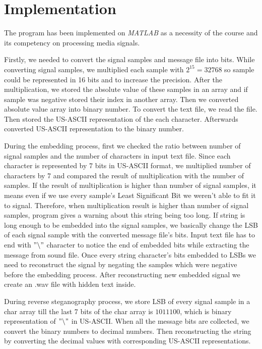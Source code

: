 \documentclass[twocolumns]{IEEEtran}
\begin{document}
	\section{Implementation}
	The program has been implemented on \textit{MATLAB} as a necessity of the course and its competency on processing media signals.
	
	Firstly, we needed to convert the signal samples and message file into bits. While converting  signal samples, we multiplied each sample with $2^{15} = 32768$ so sample could be represented in 16 bits and to increase the precision. After the multiplication, we stored the absolute value of these samples in an array and if sample was negative stored their index in another array. Then we converted absolute value array into binary number. To convert the text file, we read the file. Then stored the US-ASCII representation of the each character. Afterwards converted US-ASCII representation to the binary number.
	
	During the embedding process, first we checked the ratio between number of signal samples and the number of characters in input text file. Since each character is represented by 7 bits in US-ASCII format, we multiplied number of characters by 7 and compared the result of multiplication with the number of samples. If the result of multiplication  is higher than number of signal samples, it means even if we use every sample's Least Significant Bit we weren't able to fit it to signal. Therefore, when multiplication result is higher than number of signal samples, program gives a warning about this string being too long. If string is long enough to be embedded into the signal samples, we basically change the LSB of each signal sample with the converted message file's bits. Input text file has to end with $"\backslash "$ character to notice the end of embedded bits while extracting the message from sound file. Once every string character's bits embedded to LSBs we need to reconstruct the signal by negating the samples which were negative before the embedding process. After reconstructing new embedded signal we create an .wav file with hidden text inside.
	
	During reverse steganography process, we store LSB of every signal sample in a char array till the last 7 bits of the char array is $1011100$, which is binary representation of $"\backslash"$ in US-ASCII. When all the message bits are collected, we convert the binary numbers to decimal numbers. Then reconstructing the string by converting the decimal values with corresponding US-ASCII representations.
	
	
	
	
	
	
	
\end{document}
